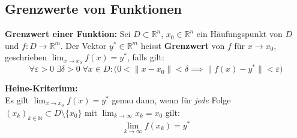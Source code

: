 \subsection{Grenzwerte von Funktionen}

\begin{definition}
    \textbf{Grenzwert einer Funktion:} Sei $D \subset \mathbb{R}^n$, $x_0 \in \mathbb{R}^n$ ein Häufungspunkt von $D$ und $f: D \to \mathbb{R}^m$. Der Vektor $y^* \in \mathbb{R}^m$ heisst \textbf{Grenzwert} von $f$ für $x \to x_0$, geschrieben $\lim_{x \to x_0} f(x) = y^*$, falls gilt:
    $$ \forall \varepsilon > 0 \; \exists \delta > 0 \; \forall x \in D: \big( 0 < \|x - x_0\| < \delta \implies \|f(x) - y^*\| < \varepsilon \big) $$
\end{definition}

\begin{theorem}
    \textbf{Heine-Kriterium:} \\
    Es gilt $\lim_{x \to x_0} f(x) = y^*$ genau dann, wenn für \textit{jede} Folge $(x_k)_{k \in \mathbb{N}} \subset D \setminus \{x_0\}$ mit $\lim_{k \to \infty} x_k = x_0$ gilt:
    $$ \lim_{k \to \infty} f(x_k) = y^* $$
\end{theorem}


